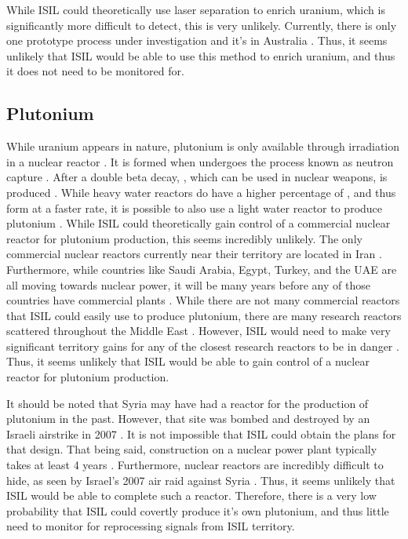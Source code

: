 \documentclass{report}
\begin{document}
While ISIL could theoretically use laser separation to enrich uranium, which is significantly more difficult to detect, this is very unlikely. Currently, there is only one prototype process under investigation and it's in Australia \cite{Moody2014}.  Thus, it seems unlikely that ISIL would be able to use this method to enrich uranium, and thus it does not need to be monitored for. 

\subsection{Plutonium} 

While uranium appears in nature, plutonium is only available through irradiation in a nuclear reactor \cite{Benedict1981}. It is formed when  undergoes the process known as neutron capture \cite{Benedict1981}.  After a double beta decay, , which can be used in nuclear weapons, is produced \cite{Duderstadt1976}.  While heavy water reactors do have a higher percentage of , and thus form  at a faster rate, it is possible to also use a light water reactor to produce plutonium \cite{Moody2014}.  While ISIL could theoretically gain control of a commercial nuclear reactor for plutonium production, this seems incredibly unlikely. The only commercial nuclear reactors currently near their territory are located in Iran \cite{WorldNuclearAssociation2015}.  Furthermore, while countries like Saudi Arabia, Egypt, Turkey, and the UAE are all moving towards nuclear power, it will be many years before any of those countries have commercial plants \cite{WorldNuclearAssociation2015}.  While there are not many commercial reactors that ISIL could easily use to produce plutonium, there are many research reactors scattered throughout the Middle East \cite{WorldNuclearAssociation2015a}.  However, ISIL would need to make very significant territory gains for any of the closest research reactors to be in danger \cite{BBC2015}.  Thus, it seems unlikely that ISIL would be able to gain control of a nuclear reactor for plutonium production.

It should be noted that Syria may have had a reactor for the production of plutonium in the past. However, that site was bombed and destroyed by an Israeli airstrike in 2007 \cite{WorldNuclearAssociation2015a}. It is not impossible that ISIL could obtain the plans for that design. That being said, construction on a nuclear power plant typically takes at least 4 years \cite{NuclearEnergyInstitute2015}.  Furthermore, nuclear reactors are incredibly difficult to hide, as seen by Israel's 2007 air raid against Syria \cite{WorldNuclearAssociation2015a}.  Thus, it seems unlikely that ISIL would be able to complete such a reactor. Therefore, there is a very low probability that ISIL could covertly produce it's own plutonium, and thus little need to monitor for reprocessing signals from ISIL territory.
\end{document}
